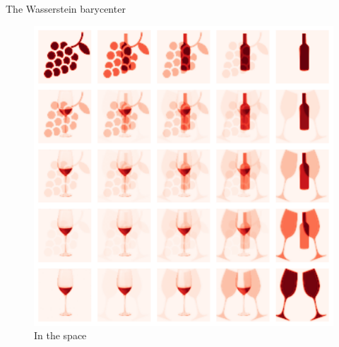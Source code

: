 \documentclass[pdf,aspectratio=169,10pt]{beamer}
\begin{document}
\begin{frame}{The Wasserstein barycenter}
     \\
    \begin{minipage}{0.48\textwidth}
        
    \begin{figure}
        \centering
            \includegraphics[clip, height=0.7\textheight]{../img/symboles_wine_L2.pdf}
            \caption{In the  space }
        \end{figure}
        

\end{minipage}
\end{frame}
\end{document}
